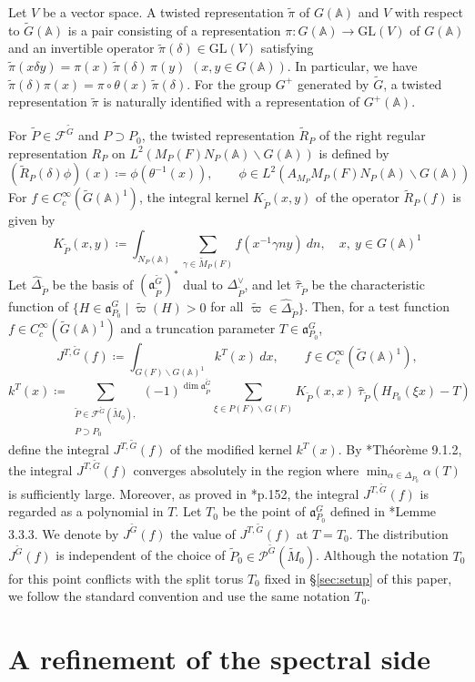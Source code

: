 \documentclass[12pt]{amsart}
\theoremstyle{definition}
\theoremstyle{plain}
\theoremstyle{remark}
\def\A{\mathbb{A}}%
\def\GL{\mathrm{GL}}
\def\inf{\infty}
\def\bs{\backslash}%
\newcommand{\fa}{\mathfrak{a}}
\newcommand{\cF}{\mathcal{F}}
\newcommand{\cP}{\mathcal{P}}
\numberwithin{equation}{section}
\newcommand{\tG}{\widetilde{G}}
\newcommand{\tM}{\widetilde{M}}
\newcommand{\tP}{\widetilde{P}}
\newcommand{\tpi}{\widetilde{\pi}}
\begin{document}
Let $V$ be a vector space.
A twisted representation $\tpi$ of $G(\A)$ and $V$ with respect to $\tG(\A)$ is a pair consisting of a representation $\pi\colon G(\A)\to \GL(V)$ of $G(\A)$ and an invertible operator $\tpi(\delta)\in \GL(V)$ satisfying
$\tpi(x\delta y)=\pi(x)\, \tpi(\delta)\, \pi(y)$ $(x,y\in G(\A))$.
In particular, we have $\tpi(\delta)\pi(x)=\pi\circ\theta(x)\, \tpi(\delta)$.
For the group $G^+$ generated by $\tG$, a twisted representation $\tpi$ is naturally identified with a representation of $G^+(\A)$.

For $\tP\in \cF^{\tG}$ and $P\supset P_0$, the twisted representation $\widetilde{R}_P$ of the right regular representation $R_P$ on
$L^2(M_P(F)N_P(\A)\bs G(\A))$ is defined by
\[
(\widetilde{R}_P(\delta)\phi)(x)\coloneqq \phi(\theta^{-1}( x )),\qquad \phi\in L^2(A_{M_P} M_P(F)N_P(\A)\bs G(\A))
\]
For $f\in C_c^\inf(\tG(\A)^1)$, the integral kernel $K_{\tP}(x,y)$ of the operator $\widetilde{R}_P(f)$ is given by
\[
K_{\tP}(x,y)\coloneqq \int_{N_P(\A)} \sum_{\gamma\in \tM_P(F)}f(x^{-1}\gamma ny)\ dn ,\quad x,\ y\in G(\A)^1
\]
Let $\hat\Delta_{\tP}$ be the basis of $(\fa_{\tP}^{\tG})^*$ dual to $\Delta_{\tP}^\vee$, and let $\hat\tau_{\tP}$ be the characteristic function of $\{H\in\fa_{P_0}^{G}\mid \widetilde{\varpi}(H)>0$ for all $ \widetilde{\varpi}\in \hat\Delta_{\tP} \}$.
Then, for a test function $f\in C^\inf_c(\tG(\A)^1)$ and a truncation parameter $T\in\fa_{P_0}^{G}$,
\[
J^{T,\tG}(f)\coloneqq \int_{G(F)\bs G(\A)^1} k^T(x) \ dx ,\qquad f\in C_c^\inf(\tG(\A)^1),
\]
\[
k^T(x)\coloneqq \sum_{\substack{ \tP\in\cF^{\tG}(\tM_0), \\ P\supset P_0}} (-1)^{\dim\fa_{\tP}^{\tG}} \sum_{\xi\in P(F)\bs G(F)} K_{\tP}(x,x)\ \hat\tau_{\tP}(H_{P_0}(\xi x)-T)
\]
define the integral $J^{T,\tG}(f)$ of the modified kernel $k^T(x)$.
By \cite{LW13}*{Th\'eor\`eme 9.1.2}, the integral $J^{T,\tG}(f)$ converges absolutely in the region where $\min_{\alpha\in\Delta_{P_0}}\alpha(T)$ is sufficiently large.
Moreover, as proved in \cite{LW13}*{p.152}, the integral $J^{T,\tG}(f)$ is regarded as a polynomial in $T$.
Let $T_0$ be the point of $\fa_{P_0}^{G}$ defined in \cite{LW13}*{Lemme 3.3.3}.
We denote by $J^{\tG}(f)$ the value of $J^{T,\tG}(f)$ at $T=T_0$.
The distribution $J^{\tG}(f)$ is independent of the choice of $\tP_0\in\cP^{\tG}(\tM_0)$.
Although the notation $T_0$ for this point conflicts with the split torus $T_0$ fixed in \S\ref{sec:setup} of this paper, we follow the standard convention and use the same notation $T_0$.


\section{A refinement of the spectral side}\label{sec:refinement}
\end{document}
